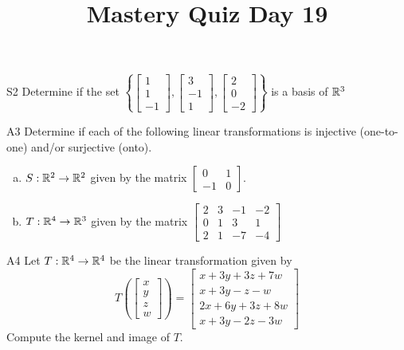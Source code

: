 \documentclass{sbgLAquiz}
\title{Mastery Quiz Day 19 }
\begin{document}
\begin{problem}{S2}
Determine if the set $\left\{\begin{bmatrix} 1 \\ 1 \\ -1 \end{bmatrix}, \begin{bmatrix} 3 \\ -1 \\ 1 \end{bmatrix},\begin{bmatrix} 2 \\ 0 \\ -2 \end{bmatrix}\right\}$ is a basis of $\mathbb{R}^3$
\end{problem}

\begin{problem}{A3}
Determine if each of the following linear transformations is injective (one-to-one) and/or surjective (onto).
\begin{enumerate}[(a)]
\item $S: \mathbb{R}^2 \rightarrow \mathbb{R}^2$ given by the matrix $\begin{bmatrix} 0 & 1 \\ -1 & 0 \end{bmatrix}$.
\item $T: \mathbb{R}^4 \rightarrow \mathbb{R}^3$ given by the matrix $\begin{bmatrix} 2 & 3 & -1 & -2 \\ 0 & 1 & 3 & 1 \\ 2 & 1 & -7 & -4 \end{bmatrix}$
\end{enumerate}
\end{problem}
\newpage

\begin{problem}{A4}
Let $T: \mathbb{R}^4\rightarrow \mathbb{R}^4$ be the linear transformation given by $$T\left(\begin{bmatrix} x \\ y \\ z \\ w \end{bmatrix} \right) = \begin{bmatrix} x+3y+3z+7w \\ x+3y-z-w \\ 2x+6y+3z+8w \\ x+3y-2z-3w \end{bmatrix}$$
Compute the kernel and image of $T$.
\end{problem}
\end{document}
